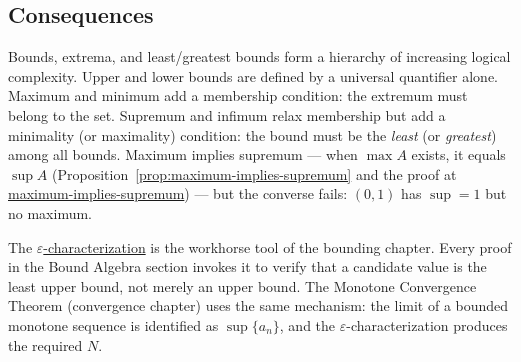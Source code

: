 \subsection*{Consequences}

\begin{remark*}
Bounds, extrema, and least/greatest bounds form a hierarchy of increasing
logical complexity.
Upper and lower bounds are defined by a universal quantifier alone.
Maximum and minimum add a membership condition: the extremum must belong
to the set.
Supremum and infimum relax membership but add a minimality (or maximality)
condition: the bound must be the \emph{least} (or \emph{greatest}) among
all bounds.
Maximum implies supremum --- when $\max A$ exists, it equals $\sup A$
(Proposition~\ref{prop:maximum-implies-supremum} and the proof at
\hyperref[prf:maximum-implies-supremum]{maximum-implies-supremum}) --- but the converse fails:
$(0,1)$ has $\sup = 1$ but no maximum.
\end{remark*}

\begin{remark*}
The \hyperref[def:epsilon-characterization-of-supremum]{$\varepsilon$-characterization} is the
workhorse tool of the bounding chapter.
Every proof in the Bound Algebra section invokes it to verify that a candidate value
is the least upper bound, not merely an upper bound.
The Monotone Convergence Theorem (convergence chapter) uses the same
mechanism: the limit of a bounded monotone sequence is identified as
$\sup\{a_n\}$, and the $\varepsilon$-characterization produces the required
$N$.
\end{remark*}














































